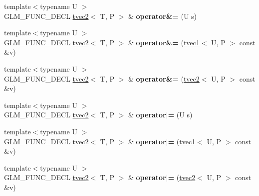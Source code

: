 \begin{DoxyCompactItemize}
\item 
\hypertarget{structglm_1_1tvec2_a8e9a4b5df0216bd755757b0561dea553}{{\footnotesize template$<$typename U $>$ }\\G\-L\-M\-\_\-\-F\-U\-N\-C\-\_\-\-D\-E\-C\-L \hyperlink{structglm_1_1tvec2}{tvec2}$<$ T, P $>$ \& {\bfseries operator\&=} (U s)}\label{structglm_1_1tvec2_a8e9a4b5df0216bd755757b0561dea553}

\item 
\hypertarget{structglm_1_1tvec2_acd64e45f039ba3b658d5a46d99fff26a}{{\footnotesize template$<$typename U $>$ }\\G\-L\-M\-\_\-\-F\-U\-N\-C\-\_\-\-D\-E\-C\-L \hyperlink{structglm_1_1tvec2}{tvec2}$<$ T, P $>$ \& {\bfseries operator\&=} (\hyperlink{structglm_1_1tvec1}{tvec1}$<$ U, P $>$ const \&v)}\label{structglm_1_1tvec2_acd64e45f039ba3b658d5a46d99fff26a}

\item 
\hypertarget{structglm_1_1tvec2_a672a9a33f367f753d0fc12116bff65bf}{{\footnotesize template$<$typename U $>$ }\\G\-L\-M\-\_\-\-F\-U\-N\-C\-\_\-\-D\-E\-C\-L \hyperlink{structglm_1_1tvec2}{tvec2}$<$ T, P $>$ \& {\bfseries operator\&=} (\hyperlink{structglm_1_1tvec2}{tvec2}$<$ U, P $>$ const \&v)}\label{structglm_1_1tvec2_a672a9a33f367f753d0fc12116bff65bf}

\item 
\hypertarget{structglm_1_1tvec2_a1cea2997d322208a92ce89a91d313a6a}{{\footnotesize template$<$typename U $>$ }\\G\-L\-M\-\_\-\-F\-U\-N\-C\-\_\-\-D\-E\-C\-L \hyperlink{structglm_1_1tvec2}{tvec2}$<$ T, P $>$ \& {\bfseries operator$\vert$=} (U s)}\label{structglm_1_1tvec2_a1cea2997d322208a92ce89a91d313a6a}

\item 
\hypertarget{structglm_1_1tvec2_a4cb8e942400c0ea18beb292a50c49958}{{\footnotesize template$<$typename U $>$ }\\G\-L\-M\-\_\-\-F\-U\-N\-C\-\_\-\-D\-E\-C\-L \hyperlink{structglm_1_1tvec2}{tvec2}$<$ T, P $>$ \& {\bfseries operator$\vert$=} (\hyperlink{structglm_1_1tvec1}{tvec1}$<$ U, P $>$ const \&v)}\label{structglm_1_1tvec2_a4cb8e942400c0ea18beb292a50c49958}

\item 
\hypertarget{structglm_1_1tvec2_a2bb8b0876df3f551acf4dae3134e0d2e}{{\footnotesize template$<$typename U $>$ }\\G\-L\-M\-\_\-\-F\-U\-N\-C\-\_\-\-D\-E\-C\-L \hyperlink{structglm_1_1tvec2}{tvec2}$<$ T, P $>$ \& {\bfseries operator$\vert$=} (\hyperlink{structglm_1_1tvec2}{tvec2}$<$ U, P $>$ const \&v)}\label{structglm_1_1tvec2_a2bb8b0876df3f551acf4dae3134e0d2e}


\end{DoxyCompactItemize}
